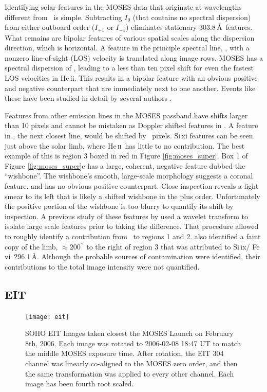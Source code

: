 		
		Identifying solar features in the MOSES data that originate at wavelengths different from \heii\ is simple. 
		Subtracting $I_0$ (that contains no spectral dispersion) from either outboard order ($I_{+1}$ or $I_{-1}$) eliminates stationary 303.8\,\AA\ features. 
		What remains are bipolar features of various spatial scales along the dispersion direction, which is horizontal.  
		A feature in the principle spectral line, \heii, with a nonzero line-of-sight (LOS) velocity is translated along image rows.    
		MOSES has a spectral dispersion of \spectdispersvel, leading to a less than ten pixel shift for even the fastest LOS velocities in He\,{\sc ii}. 
		This results in a bipolar feature with an obvious positive and negative counterpart that are immediately next to one another. Events like these have been studied in detail by several authors \citep{Fox2011,Courrier2018,Rust2019}.
		
		Features from other emission lines in the MOSES passband have shifts larger than 10 pixels and cannot be mistaken as Doppler shifted features in \heii. 
		A feature in \sixi, the next closest line, would be shifted by \sixipix\ pixels. 
		Si\,{\sc xi} features can be seen just above the solar limb, where He\,\textsc{ii}\ has little to no contribution. 
		The best example of this is region 3 boxed in red in Figure \ref{fig:moses_super}.  
		Box 1 of Figure \ref{fig:moses_super}c has a large, coherent, negative feature dubbed the ``wishbone''.  
		The wishbone's smooth, large-scale morphology suggests a coronal feature. and has no obvious positive counterpart.  
		Close inspection reveals a light smear to its left that is likely a shifted wishbone in the plus order.  
		Unfortunately the positive portion of the wishbone is too blurry to quantify its shift by inspection. 
		A previous study of these features by \citet{Rust2017} used a wavelet transform to isolate large scale features prior to taking the difference.  
		That procedure allowed \citet{Rust2017} to roughly identify a contribution from \ to regions 1 and 2.
		\citet{Rust2017} also identified a faint copy of the limb, $\approx$200$^{\prime\prime}$ to the right of region 3 that was attributed to Si\,{\sc ix}/ Fe\,{\sc vi}\ 296.1\,\AA.
		Although the probable sources of contamination were identified, their contributions to the total image intensity were not quantified.
	
	\subsection{EIT}\label{sec:EIT_data}
		\begin{figure}
			\centering
			\texttt{[image: eit]}
			\caption{SOHO EIT Images taken closest the MOSES Launch on February 8th, 2006. Each image was rotated to 2006-02-08 18:47 UT to match the middle MOSES exposure time.  After rotation, the EIT 304 channel was linearly co-aligned to the MOSES zero order, and then the same transformation was applied to every other channel.  Each image has been fourth root scaled.}
			\label{fig:EIT}
		\end{figure}
	
